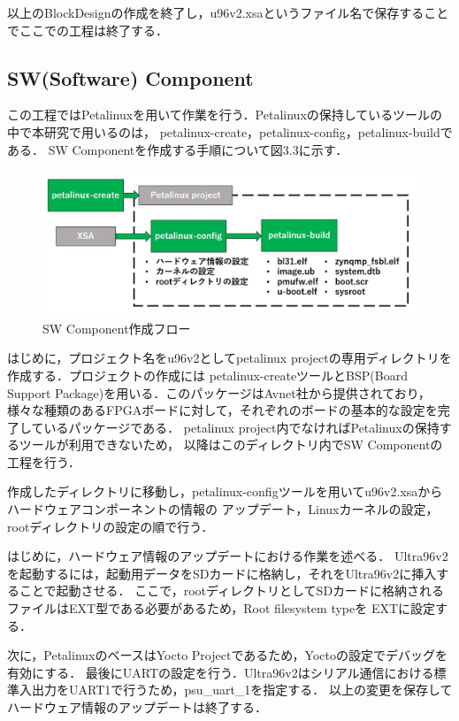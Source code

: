 \documentclass[11pt,a4j]{jreport}
\begin{document}
以上のBlockDesignの作成を終了し，u96v2.xsaというファイル名で保存することでここでの工程は終了する．

\subsection{SW(Software) Component}
この工程ではPetalinuxを用いて作業を行う．Petalinuxの保持しているツールの中で本研究で用いるのは，
petalinux-create，petalinux-config，petalinux-buildである．
SW Componentを作成する手順について図3.3に示す．
\begin{figure}[H]
  \center
  \includegraphics[scale = 0.8]{pict/pict9.jpg}
  \caption{SW Component作成フロー}
\end{figure}

はじめに，プロジェクト名をu96v2としてpetalinux projectの専用ディレクトリを作成する．プロジェクトの作成には
petalinux-createツールとBSP(Board Support Package)を用いる．このパッケージはAvnet社から提供されており，
様々な種類のあるFPGAボードに対して，それぞれのボードの基本的な設定を完了しているパッケージである．
petalinux project内でなければPetalinuxの保持するツールが利用できないため，
以降はこのディレクトリ内でSW Componentの工程を行う．

作成したディレクトリに移動し，petalinux-configツールを用いてu96v2.xsaからハードウェアコンポーネントの情報の
アップデート，Linuxカーネルの設定，rootディレクトリの設定の順で行う．

はじめに，ハードウェア情報のアップデートにおける作業を述べる．
Ultra96v2を起動するには，起動用データをSDカードに格納し，それをUltra96v2に挿入することで起動させる．
ここで，rootディレクトリとしてSDカードに格納されるファイルはEXT型である必要があるため，Root filesystem typeを
EXTに設定する．

次に，PetalinuxのベースはYocto Projectであるため，Yoctoの設定でデバッグを有効にする．
最後にUARTの設定を行う．Ultra96v2はシリアル通信における標準入出力をUART1で行うため，psu_uart_1を指定する．
以上の変更を保存してハードウェア情報のアップデートは終了する．
\end{document}
